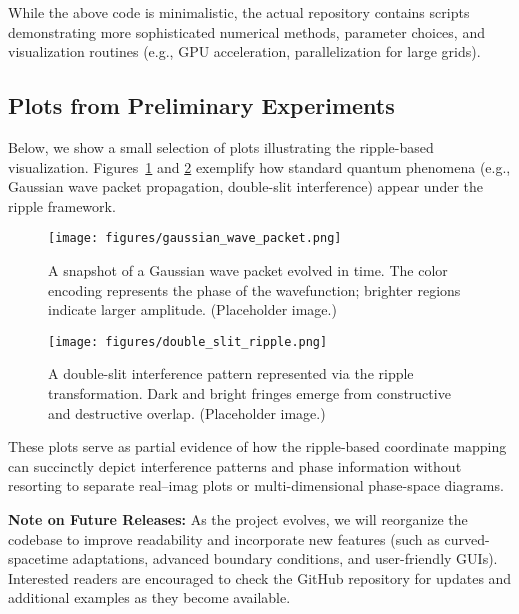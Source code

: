 \documentclass[11pt]{article}
\begin{document}
While the above code is minimalistic, the actual repository contains 
scripts demonstrating more sophisticated numerical methods, parameter 
choices, and visualization routines (e.g., GPU acceleration, 
parallelization for large grids).

\subsection{Plots from Preliminary Experiments}
\label{app:subsec:plots}
Below, we show a small selection of plots illustrating the ripple-based 
visualization. Figures~\ref{fig:gaussian-example} and 
\ref{fig:double-slit-example} exemplify how standard quantum phenomena 
(e.g., Gaussian wave packet propagation, double-slit interference) appear 
under the ripple framework.

\begin{figure}[htbp]
  \centering
  \texttt{[image: figures/gaussian\_wave\_packet.png]}
  \caption{A snapshot of a Gaussian wave packet evolved in time. 
  The color encoding represents the phase of the wavefunction; 
  brighter regions indicate larger amplitude. (Placeholder image.)}
  \label{fig:gaussian-example}
\end{figure}

\begin{figure}[htbp]
  \centering
  \texttt{[image: figures/double\_slit\_ripple.png]}
  \caption{A double-slit interference pattern represented via the 
  ripple transformation. Dark and bright fringes emerge from 
  constructive and destructive overlap. (Placeholder image.)}
  \label{fig:double-slit-example}
\end{figure}

\noindent
These plots serve as partial evidence of how the ripple-based 
coordinate mapping can succinctly depict interference patterns 
and phase information without resorting to separate real--imag 
plots or multi-dimensional phase-space diagrams.

\bigskip
\noindent
\textbf{Note on Future Releases:}  
As the project evolves, we will reorganize the codebase to 
improve readability and incorporate new features (such as 
curved-spacetime adaptations, advanced boundary conditions, 
and user-friendly GUIs). Interested readers are encouraged 
to check the GitHub repository for updates and additional 
examples as they become available.

\end{document}
